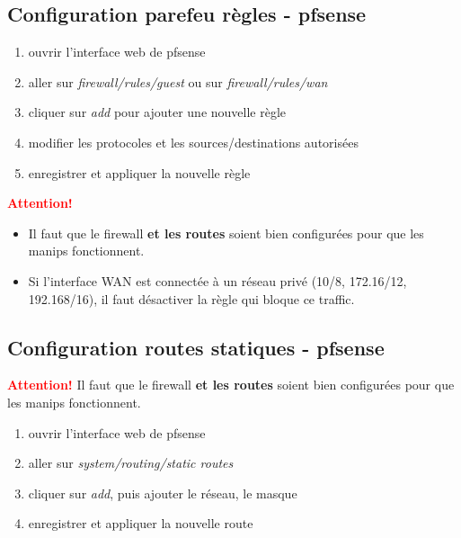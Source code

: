 \documentclass[a4paper]{article}
\begin{document}
\subsection{Configuration parefeu règles - pfsense}





\begin{enumerate}
    \item ouvrir l'interface web de pfsense
    \item aller sur \textit{firewall/rules/guest} ou sur \textit{firewall/rules/wan}
    \item cliquer sur \textit{add} pour ajouter une nouvelle règle
    \item modifier les protocoles et les sources/destinations autorisées
    \item enregistrer et appliquer la nouvelle règle
\end{enumerate}
\textcolor{red}{\textbf{Attention!}}
\begin{itemize}
    \item Il faut que le firewall \textbf{et les routes} soient bien configurées pour que les manips fonctionnent.
    \item Si l'interface WAN est connectée à un réseau privé (10/8, 172.16/12, 192.168/16), il faut désactiver la règle qui bloque ce traffic.
\end{itemize}










\subsection{Configuration routes statiques - pfsense}





\textcolor{red}{\textbf{Attention!}} Il faut que le firewall \textbf{et les routes} soient bien configurées pour que les manips fonctionnent.
\begin{enumerate}
    \item ouvrir l'interface web de pfsense
    \item aller sur \textit{system/routing/static routes}
    \item cliquer sur \textit{add}, puis ajouter le réseau, le masque
    \item enregistrer et appliquer la nouvelle route
\end{enumerate}
\end{document}
